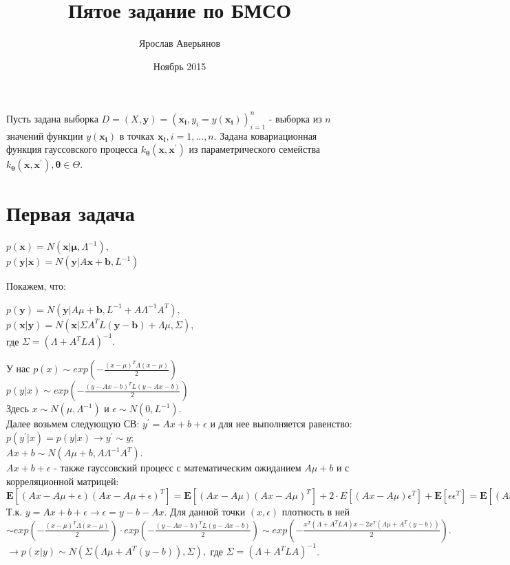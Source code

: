 \documentclass{article}
\title{Пятое задание по БМСО}
\author{Ярослав Аверьянов}
\date{Ноябрь 2015}
\begin{document}
\maketitle

Пусть задана выборка $D = (X, \mathbf{y}) = {(\mathbf{x_i}, y_i = y(\mathbf{\mathbf{x_i}}))}_{i=1}^n$ - выборка из $n$ значений функции $y(\mathbf{x_i})$ в точках $\mathbf{x_i}, i = 1,...,n$. Задана ковариационная функция гауссовского процесса $k_{\mathbf{\theta}}(\mathbf{x},\mathbf{x^{'}})$ из параметрического семейства ${k_{\mathbf{\theta}}(\mathbf{x}, \mathbf{x^{'}}), \mathbf{\theta} \in \Theta}$.

\section{Первая задача}
\begin{center}
$p(\mathbf{x}) = N(\mathbf{x}|\mathbf{\mu}, \Lambda^{-1}),$\\
$p(\mathbf{y}|\mathbf{x}) = N(\mathbf{y}|A\mathbf{x} + \mathbf{b}, L^{-1})$
\end{center}
Покажем, что:
\begin{center}
$p(\mathbf{y}) = N(\mathbf{y}|A\mu + \mathbf{b}, L^{-1} + A\Lambda^{-1}A^{T}),$\\
$p(\mathbf{x}|\mathbf{y}) = N(\mathbf{x}|\Sigma A^{T}L(\mathbf{y} - \mathbf{b}) + \Lambda\mu,\Sigma),$\\
где $\Sigma = (\Lambda + A^{T}LA)^{-1}.$
\end{center}
У нас $p(x) \sim exp(-\frac{(x - \mu)^{T}\Lambda(x - \mu)}{2})$\\
$p(y|x) \sim exp(-\frac{(y - Ax -b)^{T}L(y - Ax - b)}{2})$\\
Здесь $x \sim N(\mu, \Lambda^{-1})$ и $\epsilon \sim N(0,L^{-1})$.\\
Далее возьмем следующую СВ: $y^{'} = Ax + b + \epsilon$ и для нее выполняется равенство: $p(y^{'}|x) = p(y|x) \to y^{'} \sim y;$\\
$Ax + b \sim N(A\mu + b, A\Lambda^{-1}A^{T}).$\\
$Ax + b + \epsilon$ - также гауссовский процесс с математическим ожиданием $A\mu + b$ и с корреляционной матрицей:\\
$\mathbf{E}[(Ax - A\mu + \epsilon)(Ax - A\mu + \epsilon)^{T}] = \mathbf{E}[(Ax - A\mu)(Ax - A\mu)^{T}] + 2\cdot E[(Ax - A\mu)\epsilon^{T}] + \mathbf{E}[\epsilon\epsilon^{T}] = \mathbf{E}[(Ax - A\mu)(Ax - A\mu)^{T}] + \mathbf{E}[\epsilon\epsilon^{T}] = A\Lambda^{-1}A^{T} + L^{-1} \to y \sim N(A\mu + b, A\Lambda^{-1}A^{T} + L^{-1});$\\
Т.к. $y = Ax + b + \epsilon \to \epsilon = y - b - Ax$. Для данной точки $(x,\epsilon)$ плотность в ней $\sim exp(-\frac{(x-\mu)^{T}\Lambda(x-\mu)}{2})\cdot exp(-\frac{(y-Ax-b)^{T}L(y-Ax-b)}{2}) \sim exp(-\frac{x^{T}(\Lambda + A^{T}LA)x - 2x^{T}(\Lambda\mu + A^{T}(y-b))}{2}).$\\
$\to p(x|y) \sim N(\Sigma(\Lambda\mu + A^{T}(y - b)), \Sigma),$ где $\Sigma = (\Lambda + A^{T}LA)^{-1}$.   
\end{document}
